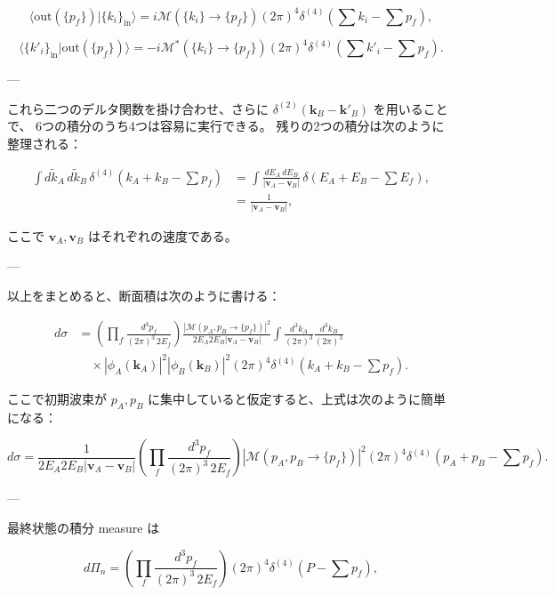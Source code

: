 \documentclass[a4paper,12pt]{article}
\begin{document}
\[
\langle \text{out}(\{p_f\}) | \{k_i\}_{\text{in}} \rangle 
= i\mathcal{M}(\{k_i\}\to\{p_f\})(2\pi)^4\delta^{(4)}\!\left(\sum k_i - \sum p_f\right),
\]

\[
\langle \{k'_i\}_{\text{in}} | \text{out}(\{p_f\}) \rangle 
= -i\mathcal{M}^*(\{k_i\}\to\{p_f\})(2\pi)^4\delta^{(4)}\!\left(\sum k'_i - \sum p_f\right).
\]

---

これら二つのデルタ関数を掛け合わせ、さらに $\delta^{(2)}(\mathbf{k}_B - \mathbf{k}'_B)$ を用いることで、  
6つの積分のうち4つは容易に実行できる。  
残りの2つの積分は次のように整理される：

\begin{align}
\int d\tilde{k}_A \, d\tilde{k}_B \, \delta^{(4)}(k_A+k_B-\sum p_f)
&= \int \frac{dE_A \, dE_B}{|\mathbf{v}_A - \mathbf{v}_B|} \, 
\delta(E_A+E_B-\sum E_f), \nonumber \\
&= \frac{1}{|\mathbf{v}_A - \mathbf{v}_B|},
\tag{4.77}
\end{align}

ここで $\mathbf{v}_A, \mathbf{v}_B$ はそれぞれの速度である。

---

以上をまとめると、断面積は次のように書ける：

\begin{align*}
d\sigma &=
\left( \prod_f \frac{d^3p_f}{(2\pi)^3 \, 2E_f} \right)
\frac{|\mathcal{M}(p_A,p_B\to\{p_f\})|^2}{2E_A 2E_B |\mathbf{v}_A - \mathbf{v}_B|}
\int \frac{d^3k_A}{(2\pi)^3} \frac{d^3k_B}{(2\pi)^3}\\
&\quad \times |\phi_A(\mathbf{k}_A)|^2 |\phi_B(\mathbf{k}_B)|^2 
(2\pi)^4 \delta^{(4)}(k_A+k_B-\sum p_f).
\tag{4.78}
\end{align*}

ここで初期波束が $p_A, p_B$ に集中していると仮定すると、上式は次のように簡単になる：

\begin{equation}
d\sigma =
\frac{1}{2E_A 2E_B |\mathbf{v}_A - \mathbf{v}_B|}
\left( \prod_f \frac{d^3p_f}{(2\pi)^3 \, 2E_f} \right)
|\mathcal{M}(p_A,p_B\to\{p_f\})|^2 
(2\pi)^4 \delta^{(4)}(p_A+p_B-\sum p_f).
\tag{4.79}
\end{equation}

---

最終状態の積分 measure は

\begin{equation}
d\Pi_n = 
\left( \prod_f \frac{d^3p_f}{(2\pi)^3 \, 2E_f} \right)
(2\pi)^4 \delta^{(4)}(P-\sum p_f),
\tag{4.80}
\end{equation}
\end{document}
